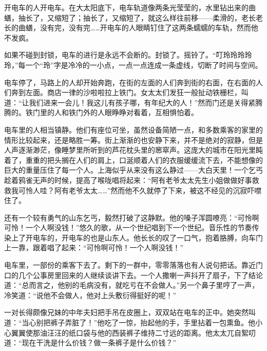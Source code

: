 \par 开电车的人开电车。在大太阳底下，电车轨道像两条光莹莹的，水里钻出来的曲蟮，抽长了，又缩短了；抽长了，又缩短了，就这么样往前移——柔滑的，老长老长的曲蟮，没有完，没有完……开电车的人眼睛钉住了这两条蠕蠕的车轨，然而他不发疯。
\par 如果不碰到封锁，电车的进行是永远不会断的。封锁了。摇铃了。“叮玲玲玲玲玲，”每一个“玲”字是冷冷的一小点，一点一点连成一条虚线，切断了时间与空间。
\par 电车停了，马路上的人却开始奔跑，在街的左面的人们奔到街的右面，在右面的人们奔到左面。商店一律的沙啦啦拉上铁门。女太太们发狂一般扯动铁栅栏，叫道：“让我们进来一会儿！我这儿有孩子哪，有年纪大的人！”然而门还是关得紧腾腾的。铁门里的人和铁门外的人眼睁睁对看着，互相惧怕着。
\par 电车里的人相当镇静。他们有座位可坐，虽然设备简陋一点，和多数乘客的家里的情形比较起来，还是略胜一筹。街上渐渐的也安静下来，并不是绝对的寂静，但是人声逐渐渺茫，像睡梦里所听到的芦花枕头里的窸窣声。这庞大的城市在阳光里盹着了，重重的把头搁在人们的肩上，口涎顺着人们的衣服缓缓流下去，不能想像的巨大的重量压住了每一个人。上海似乎从来没有这么静过——大白天里！一个乞丐趁着鸦雀无声的时候，提高了喉咙唱将起来：“阿有老爷太太先生小姐做做好事救救我可怜人哇？阿有老爷太太……”然而他不久就停了下来，被这不经见的沉寂吓噤住了。
\par 还有一个较有勇气的山东乞丐，毅然打破了这静默。他的嗓子浑圆嘹亮：“可怜啊可怜！一个人啊没钱！”悠久的歌，从一个世纪唱到下一个世纪。音乐性的节奏传染上了开电车的，开电车的也是山东人。他长长的叹了一口气，抱着胳膊，向车门上一靠，跟着唱了起来：“可怜啊可怜！一个人啊没钱！”
\par 电车里，一部份的乘客下去了。剩下的一群中，零零落落也有人说句把话。靠近门口的几个公事房里回来的人继续谈讲下去。一个人撒喇一声抖开了扇子，下了结论道：“总而言之，他别的毛病没有，就吃亏在不会做人。”另一个鼻子里哼了一声，冷笑道：“说他不会做人，他对上头敷衍得挺好的呢！”
\par 一对长得颇像兄妹的中年夫妇把手吊在皮圈上，双双站在电车的正中。她突然叫道：“当心别把裤子弄脏了！”他吃了一惊，抬起他的手，手里拈着一包熏鱼。他小心翼翼使那油汪汪的纸口袋与他的西装裤子维持二寸远的距离。他太太兀自絮叨道：“现在干洗是什么价钱？做一条裤子是什么价钱？”
